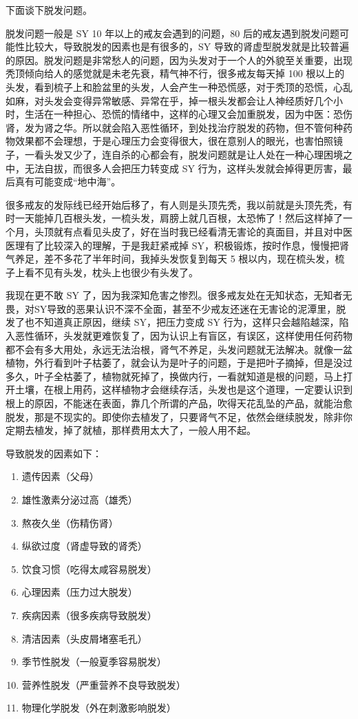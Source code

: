 \documentclass{ctexart}
\begin{document}
下面谈下脱发问题。

脱发问题一般是 SY 10 年以上的戒友会遇到的问题，80 后的戒友遇到脱发问题可能性比较大，导致脱发的因素也是有很多的，SY 导致的肾虚型脱发就是比较普遍的原因。脱发问题是非常愁人的问题，因为头发对于一个人的外貌至关重要，出现秃顶倾向给人的感觉就是未老先衰，精气神不行，很多戒友每天掉 100 根以上的头发，看到梳子上和脸盆里的头发，人会产生一种恐慌感，对于秃顶的恐慌，心乱如麻，对头发会变得异常敏感、异常在乎，掉一根头发都会让人神经质好几个小时，生活在一种担心、恐慌的情绪中，这样的心理又会加重脱发，因为中医：恐伤肾，发为肾之华。所以就会陷入恶性循环，到处找治疗脱发的药物，但不管何种药物效果都不会理想，于是心理压力会变得很大，很在意别人的眼光，也害怕照镜子，一看头发又少了，连自杀的心都会有，脱发问题就是让人处在一种心理困境之中，无法自拔，而很多人会把压力转变成 SY 行为，这样头发就会掉得更厉害，最后真有可能变成“地中海”。

很多戒友的发际线已经开始后移了，有人则是头顶先秃，我以前就是头顶先秃，有时一天能掉几百根头发，一梳头发，肩膀上就几百根，太恐怖了！然后这样掉了一个月，头顶就有点看见头皮了，好在当时我已经看清无害论的真面目，并且对中医医理有了比较深入的理解，于是我赶紧戒掉 SY，积极锻炼，按时作息，慢慢把肾气养足，差不多花了半年时间，我掉头发恢复到每天 5 根以内，现在梳头发，梳子上看不见有头发，枕头上也很少有头发了。

我现在更不敢 SY 了，因为我深知危害之惨烈。很多戒友处在无知状态，无知者无畏，对SY导致的恶果认识不深不全面，甚至不少戒友还迷在无害论的泥潭里，脱发了也不知道真正原因，继续 SY，把压力变成 SY 行为，这样只会越陷越深，陷入恶性循环，头发就更难恢复了，因为认识上有盲区，有误区，这样使用任何药物都不会有多大用处，永远无法治根，肾气不养足，头发问题就无法解决。就像一盆植物，外行看到叶子枯萎了，就会认为是叶子的问题，于是把叶子摘掉，但是没过多久，叶子全枯萎了，植物就死掉了，换做内行，一看就知道是根的问题，马上打开土壤，在根上用药，这样植物才会继续存活，头发也是这个道理，一定要认识到根上的原因，不能迷在表面，靠几个所谓的产品，吹得天花乱坠的产品，就能治愈脱发，那是不现实的。即使你去植发了，只要肾气不足，依然会继续脱发，除非你定期去植发，掉了就植，那样费用太大了，一般人用不起。


导致脱发的因素如下：

\begin{enumerate}
    \item 遗传因素（父母）
    \item 雄性激素分泌过高（雄秃）
    \item 熬夜久坐（伤精伤肾）
    \item 纵欲过度（肾虚导致的肾秃）
    \item 饮食习惯（吃得太咸容易脱发）
    \item 心理因素（压力过大脱发）
    \item 疾病因素（很多疾病导致脱发）
    \item 清洁因素（头皮屑堵塞毛孔）
    \item 季节性脱发（一般夏季容易脱发）
    \item 营养性脱发（严重营养不良导致脱发）
    \item 物理化学脱发（外在刺激影响脱发）
\end{enumerate}
\end{document}
